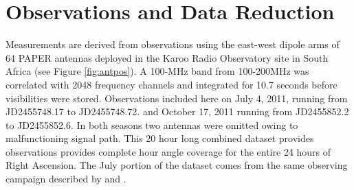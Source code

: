 \documentclass[preprint]{aastex}
\begin{document}


 
 \section{Observations and Data Reduction}
 \label{sec:Observations}

 Measurements are derived from observations using  the east-west dipole arms of
64 PAPER antennas deployed in the Karoo Radio Observatory site in South Africa
(see Figure \ref{fig:antpos}).  A 100-MHz band from 100-200MHz was correlated
with 2048 frequency channels and integrated for 10.7 seconds before
visibilities were stored.  Observations included here on  July 4, 2011, running
from JD2455748.17 to JD2455748.72. and October 17, 2011 running from
JD2455852.2 to JD2455852.6.  In both seasons two antennas were omitted owing to
malfunctioning signal path. This 20 hour long combined dataset provides
observations provides complete hour angle coverage for the entire 24 hours of
Right Ascension. The July portion of the dataset comes from the same observing
campaign described by \cite{Pober:2013p9567} and \cite{Stefan:2012p9707}. 
\end{document}

